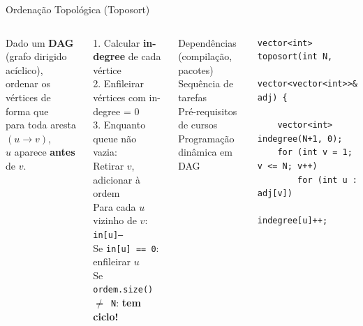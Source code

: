 \documentclass[aspectratio=169,10pt]{beamer}
\begin{document}
\begin{frame}[fragile]{Ordenação Topológica (Toposort)}
  \begin{columns}[t]
      \begin{tcolorbox}[caixaAzul,title={O que é?}]
        \small
        Dado um \textbf{DAG} (grafo dirigido acíclico),\\
        ordenar os vértices de forma que\\
        para toda aresta $(u \to v)$,\\
        $u$ aparece \textbf{antes} de $v$.
      \end{tcolorbox}
      \vspace{0.07cm}
      \begin{tcolorbox}[caixaGrafo,title={Algoritmo de Kahn (BFS)}]
        \footnotesize
        1. Calcular \textbf{in-degree} de cada vértice\\
        2. Enfileirar vértices com in-degree = 0\\
        3. Enquanto queue não vazia:\\
        \quad Retirar $v$, adicionar à ordem\\
        \quad Para cada $u$ vizinho de $v$:\\
        \quad\quad \texttt{in[u]--}\\
        \quad\quad Se \texttt{in[u] == 0}: enfileirar $u$\\[3pt]
        Se \texttt{ordem.size() $\neq$ N}: \textbf{tem ciclo!}
      \end{tcolorbox}
      \vspace{0.07cm}
      \begin{tcolorbox}[caixaAmarelo,title={Aplicações}]
        \footnotesize
        Dependências (compilação, pacotes)\\
        Sequência de tarefas\\
        Pré-requisitos de cursos\\
        Programação dinâmica em DAG
      \end{tcolorbox}
      \begin{tcolorbox}[caixaCodigo]
        \begin{lstlisting}[style=cppsmall]
vector<int> toposort(int N,
    vector<vector<int>>& adj) {

    vector<int> indegree(N+1, 0);
    for (int v = 1; v <= N; v++)
        for (int u : adj[v])
            indegree[u]++;


\end{lstlisting}
\end{tcolorbox}
\end{columns}
\end{frame}
\end{document}
